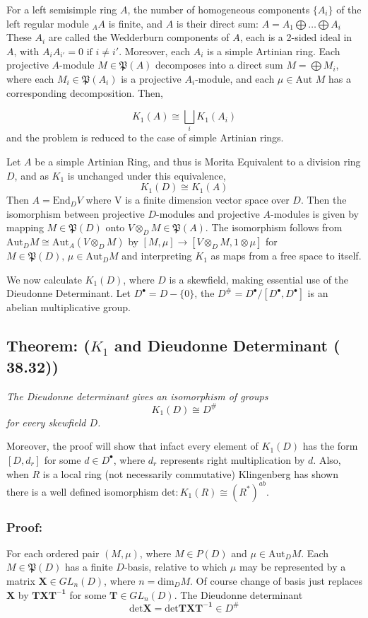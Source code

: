 For a left semisimple ring $A$, the number of homogeneous components $\{A_i\}$ of the left regular module $_AA$ is finite, and $A$ is their direct sum:
$A=A_1\bigoplus \dots \bigoplus A_i$
These $A_i$ are called the Wedderburn components of $A$, each is a 2-sided ideal in $A$, with $A_iA_{i'}=0\text{ if } i\neq i'$. Moreover, each $A_i$ is a simple Artinian ring. Each projective $A$-module $M\in \mathfrak P(A)$ decomposes into a direct sum $M=\bigoplus M_i$, where each $M_i\in \mathfrak P(A_i)$ is a projective $A_i$-module, and each $\mu\in \text{Aut }M$ has a corresponding decomposition. Then,

$$K_1(A) \cong \bigsqcup_i K_1(A_i)$$
and the problem is reduced to the case of simple Artinian rings.

Let $A$ be a simple Artinian Ring, and thus is Morita Equivalent to a division ring $D$, and as $K_1$ is unchanged under this equivalence,
$$K_1(D) \cong K_1(A)$$
Then $A= \text{End}_D V$ where V is a finite dimension vector space over $D$. Then the isomorphism between projective $D$-modules  and projective $A$-modules is given by mapping $M\in\mathfrak P (D)$ onto $V\otimes_D M \in \mathfrak P(A)$. The isomorphism follows from $\text{Aut}_D M \cong \text{Aut}_A(V\otimes_D M)$ by $[M,\mu ] \rightarrow [V \otimes_D M, 1\otimes \mu ] $ for $M\in \mathfrak P(D), \, \mu\in \text{Aut}_D M$ and interpreting $K_1$ as maps from a free space to itself.

We now calculate $K_1(D)$, where $D$ is a skewfield, making essential use of the Dieudonne Determinant. Let $D^\bullet = D - \{0\}$, the $D^{\#} = D^\bullet / [D^\bullet, D^\bullet]$ is an abelian multiplicative group.

\subsection{Theorem: ($K_1$ and Dieudonne Determinant (\cite{CR} 38.32))}
\emph{The Dieudonne determinant gives an isomorphism of groups 
$$K_1(D) \cong D^{\#}$$
for every skewfield $D$.}

Moreover, the proof will show that infact every element of $K_1(D)$ has the form $[ D , d_r ]$ for some $d\in D^\bullet$, where $d_r$ represents right multiplication by $d$. Also, when $R$ is a local ring (not necessarily commutative) Klingenberg has shown there is a well defined isomorphism $\text{det}:K_1(R)\cong (R^*)^{ab}$.

\subsubsection*{Proof:}
For each ordered pair $(M, \mu)$, where $M\mathfrak \in P (D)$ and $\mu \in \text{Aut}_D M$. Each $M\in \mathfrak P(D)$ has a finite $D$-basis, relative to which $\mu$ may be represented by a matrix $\mathbf X \in GL_n(D)$, where $n=\text{dim}_D M $. Of course change of basis just replaces $\mathbf X$ by 
$\mathbf{TXT^{-1}}$ for some $\mathbf T \in GL_n (D)$. The Dieudonne determinant 
$$\text{det} \mathbf X = \text{det} \mathbf{TXT^{-1}}\in D^{\#}$$

